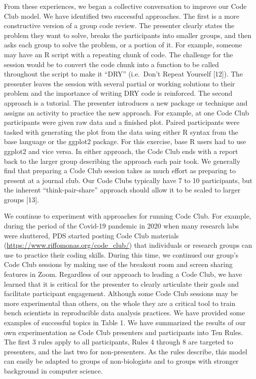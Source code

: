 \documentclass[
  11pt,
]{article}
\begin{document}
From these experiences, we began a collective conversation to improve
our Code Club model. We have identified two successful approaches. The
first is a more constructive version of a group code review. The
presenter clearly states the problem they want to solve, breaks the
participants into smaller groups, and then asks each group to solve the
problem, or a portion of it. For example, someone may have an R script
with a repeating chunk of code. The challenge for the session would be
to convert the code chunk into a function to be called throughout the
script to make it ``DRY'' (i.e.~Don't Repeat Yourself {[}12{]}). The
presenter leaves the session with several partial or working solutions
to their problem and the importance of writing DRY code is reinforced.
The second approach is a tutorial. The presenter introduces a new
package or technique and assigns an activity to practice the new
approach. For example, at one Code Club participants were given raw data
and a finished plot. Paired participants were tasked with generating the
plot from the data using either R syntax from the base language or the
ggplot2 package. For this exercise, base R users had to use ggplot2 and
vice versa. In either approach, the Code Club ends with a report back to
the larger group describing the approach each pair took. We generally
find that preparing a Code Club session takes as much effort as
preparing to present at a journal club. Our Code Clubs typically have 7
to 10 participants, but the inherent ``think-pair-share'' approach
should allow it to be scaled to larger groups {[}13{]}.

We continue to experiment with approaches for running Code Club. For
example, during the period of the Covid-19 pandemic in 2020 when many
research labs were shuttered, PDS started posting Code Club materials
(\url{https://www.riffomonas.org/code_club/}) that individuals or
research groups can use to practice their coding skills. During this
time, we continued our group's Code Club sessions by making use of the
breakout room and screen sharing features in Zoom. Regardless of our
approach to leading a Code Club, we have learned that it is critical for
the presenter to clearly articulate their goals and facilitate
participant engagement. Although some Code Club sessions may be more
experimental than others, on the whole they are a critical tool to train
bench scientists in reproducible data analysis practices. We have
provided some examples of successful topics in Table 1. We have
summarized the results of our own experimentation as Code Club
presenters and participants into Ten Rules. The first 3 rules apply to
all participants, Rules 4 through 8 are targeted to presenters, and the
last two for non-presenters. As the rules describe, this model can
easily be adapted to groups of non-biologists and to groups with
stronger background in computer science.
\end{document}
